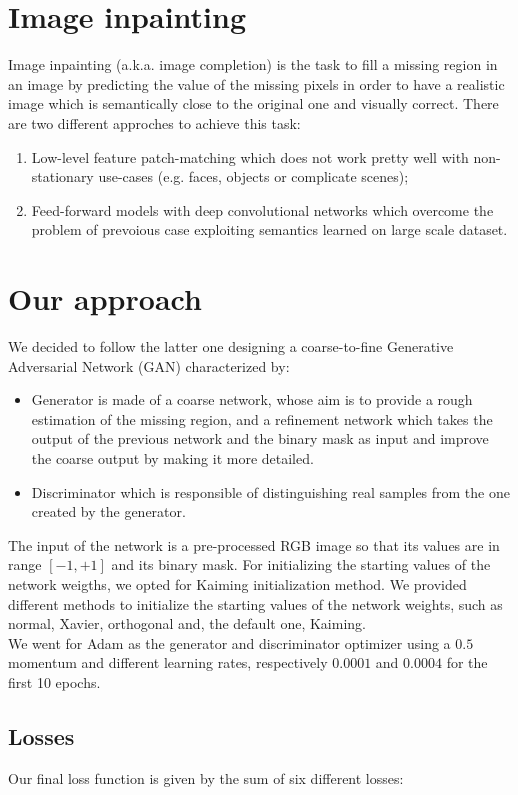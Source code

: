 \documentclass[10pt,twocolumn,letterpaper]{article}
\begin{document}
\section{Image inpainting}
Image inpainting (a.k.a. image completion) is the task to fill a missing region
in an image by predicting the value of the missing pixels in order to have a
realistic image which is semantically close to the original one and visually
correct. There are two different approches to achieve this task:
\begin{enumerate}
  \item Low-level feature patch-matching which does not work pretty well with
    non-stationary use-cases (e.g. faces, objects or complicate scenes);
  \item	Feed-forward models with deep convolutional networks which overcome the
    problem of prevoious case exploiting semantics learned on large scale
    dataset.
\end{enumerate}
\section{Our approach}
We decided to follow the latter one designing a coarse-to-fine Generative
Adversarial Network (GAN) characterized by:
\begin{itemize}
	\item Generator is made of a coarse network, whose aim is to provide a rough
    estimation of the missing region, and a refinement network which takes the
    output of the previous network and the binary mask as input and improve the
    coarse output by making it more detailed.
  \item	Discriminator which is responsible of distinguishing real samples from
    the one created by the generator.
\end{itemize}
The input of the network is a pre-processed RGB image so that its values are in
range \([-1,+1]\) and its binary mask. For initializing the starting values of
the network weigths, we opted for Kaiming initialization method. We provided
different methods to initialize the starting values of the network weights, such
as normal, Xavier, orthogonal and, the default one, Kaiming.\\

We went for Adam as the generator and discriminator optimizer using a \(0.5\)
momentum and different learning rates, respectively \(0.0001\) and \(0.0004\)
for the first 10 epochs.

\subsection{Losses}
Our final loss function is given by the sum of six different losses:
\end{document}
